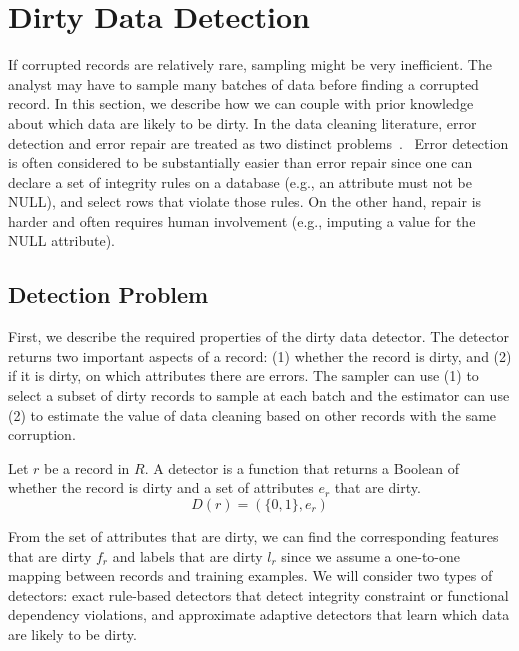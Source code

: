 \section{Dirty Data Detection}\label{det}
If corrupted records are relatively rare, sampling might be very inefficient.
The analyst may have to sample many batches of data before finding a corrupted record.
In this section, we describe how we can couple \sys with prior knowledge about which data are likely to be dirty.
In the data cleaning literature, error detection and error repair are treated as two distinct problems~\cite{DBLP:series/synthesis/2012Fan, Dasu:2003:EDM:861869, rahm2000data}.
 Error detection is often considered to be substantially easier than error repair since one can declare a set of integrity rules on a database (e.g., an attribute must not be NULL), and select rows that violate those rules.
On the other hand, repair is harder and often requires human involvement (e.g., imputing a value for the NULL attribute).

\subsection{Detection Problem}
First, we describe the required properties of the dirty data detector.
The detector returns two important aspects of a record: 
(1) whether the record is dirty, and (2) if it is dirty, on which attributes there are errors.
The sampler can use (1) to select a subset of dirty records to sample at each batch and 
the estimator can use (2) to estimate the value of data cleaning based on other records with the same corruption.

\begin{definition}[Detector]
Let $r$ be a record in $R$. A detector is a function that returns a Boolean of whether the record is dirty and a set of attributes $e_r$ that are dirty.
\[
D(r) = (\{0,1\}, e_r)
\]
\end{definition}

From the set of attributes that are dirty, we can find the corresponding features that are dirty $f_r$ and labels that are dirty $l_r$ since we assume a one-to-one mapping between records and training examples.
We will consider two types of detectors: exact rule-based detectors that detect integrity constraint or functional dependency violations, and approximate adaptive detectors that learn which data are likely to be dirty.

